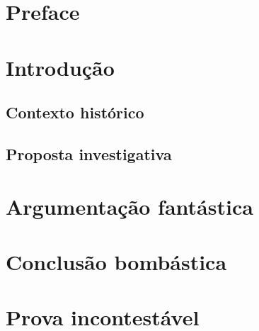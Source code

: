 \section*{Preface}
\section{Introdução}
\subsection{Contexto histórico}
\subsection{Proposta investigativa}
\section{Argumentação fantástica}
\section{Conclusão bombástica}
\appendix
\section{Prova incontestável}
